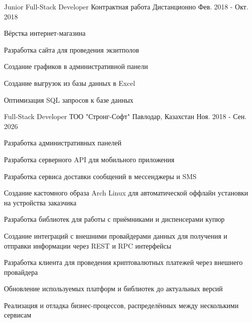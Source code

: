 

\begin{cventries}

  \cventry
    {Junior Full-Stack Developer} %
    {Контрактная работа} %
    {Дистанционно} %
    {Фев. 2018 - Окт. 2018} %
    {
      \begin{cvitems} %
        \item {Вёрстка интернет-магазина}
        \item {Разработка сайта для проведения экзитполов}
        \item {Создание графиков в административной панели}
        \item {Создание выгрузок из базы данных в Excel}
        \item {Оптимизация SQL запросов к базе данных}
      \end{cvitems}
    }

  \cventry
    {Full-Stack Developer} %
    {ТОО "Стронг-Софт"} %
    {Павлодар, Казахстан} %
    {Ноя. 2018 - Сен. 2026} %
    {
      \begin{cvitems} %
        \item {Разработка административных панелей}
        \item {Разработка серверного API для мобильного приложения}
        \item {Разработка сервиса доставки сообщений в мессенджеры и SMS}
        \item {Создание кастомного образа Arch Linux для автоматической оффлайн установки на устройства заказчика}
        \item {Разработка библиотек для работы с приёмниками и диспенсерами купюр}
        \item {Создание интеграций с внешними провайдерами данных для получения и отправки информации через REST и RPC интерфейсы}
        \item {Разработка клиента для проведения криптовалютных платежей через внешнего провайдера}
        \item {Обновление используемых платформ и библиотек до актуальных версий}
        \item {Реализация и отладка бизнес-процессов, распределённых между несколькими сервисам}
      \end{cvitems}
    }


\end{cventries}
